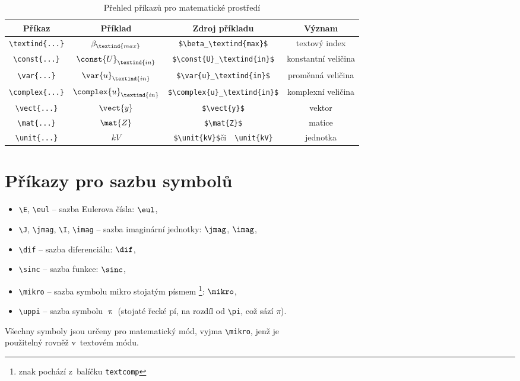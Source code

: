 \begin{table}[!h]
  \caption[Přehled příkazů]{Přehled příkazů pro matematické prostředí }
  \begin{center}
  	\small
	  \begin{tabular}{|c|c|c|c|}
	    \hline
	    Příkaz    						& Příklad 					& Zdroj příkladu  							& Význam  \\
	    \hline\hline
	    \verb|\textind{...}|	& $\beta_\textind{max}$ 	& \verb|$\beta_\textind{max}$|	& textový index \\
	    \hline
	    \verb|\const{...}| 		& $\const{U}_\textind{in}$ 				& \verb|$\const{U}_\textind{in}$|		& konstantní veličina \\
	    \hline
	    \verb|\var{...}| 		& $\var{u}_\textind{in}$ & \verb|$\var{u}_\textind{in}$| & proměnná veličina \\
	    \hline
	    \verb|\complex{...}| 	& $\complex{u}_\textind{in}$ & \verb|$\complex{u}_\textind{in}$| & komplexní veličina \\
	    \hline
	    \verb|\vect{...}| 		& $\vect{y}$ 						& \verb|$\vect{y}$| & vektor \\
	    \hline
	    \verb|\mat{...}| 	& $\mat{Z}$ 						& \verb|$\mat{Z}$| & matice \\
	    \hline
	    \verb|\unit{...}| 		& $\unit{kV}$ 						& \verb|$\unit{kV}$|\quad či\ \, \verb|\unit{kV}| & jednotka \\
	    \hline
	  \end{tabular}
  \end{center}
\end{table}



\section{Příkazy pro sazbu symbolů}

\begin{itemize}
  \item
    \verb|\E|, \verb|\eul| -- sazba Eulerova čísla: $\eul$,
  \item
    \verb|\J|, \verb|\jmag|, \verb|\I|, \verb|\imag| -- sazba imaginární jednotky: $\jmag$, $\imag$,
  \item
    \verb|\dif| -- sazba diferenciálu: $\dif$,
  \item
    \verb|\sinc| -- sazba funkce: $\sinc$,
  \item
    \verb|\mikro| -- sazba symbolu mikro stojatým písmem%
			\footnote{znak pochází z~balíčku \texttt{textcomp}}: $\mikro$,
	\item
		\verb|\uppi| -- sazba symbolu $\uppi$
			(stojaté řecké pí, na rozdíl od \verb|\pi|, což sází $\pi$).
\end{itemize}
%
Všechny symboly jsou určeny pro matematický mód, vyjma \verb|\mikro|, jenž je\\ použitelný rovněž v~textovém módu.


